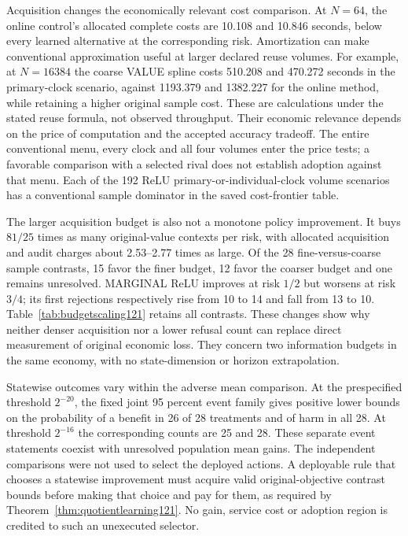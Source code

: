Acquisition changes the economically relevant cost comparison. At $N=64$,
the online control's allocated complete costs are 10.108 and 10.846 seconds,
below every learned alternative at the corresponding risk. Amortization can
make conventional approximation useful at larger declared reuse volumes.
For example, at $N=16384$ the coarse VALUE spline costs 510.208 and 470.272
seconds in the primary-clock scenario, against 1193.379 and 1382.227 for the
online method, while retaining a higher original sample cost. These are
calculations under the stated reuse formula, not observed throughput. Their
economic relevance depends on the price of computation and the accepted
accuracy tradeoff. The entire conventional menu, every clock and all four
volumes enter the price tests; a favorable comparison with a selected rival
does not establish adoption against that menu. Each of the 192 ReLU
primary-or-individual-clock volume scenarios has a conventional sample
dominator in the saved cost-frontier table.

The larger acquisition budget is also not a monotone policy improvement.
It buys $81/25$ times as many original-value contexts per risk, with allocated
acquisition and audit charges about 2.53--2.77 times as large. Of the 28
fine-versus-coarse sample contrasts, 15 favor the finer budget, 12 favor the
coarser budget and one remains unresolved. MARGINAL ReLU improves at risk
$1/2$ but worsens at risk $3/4$; its first rejections respectively rise from
10 to 14 and fall from 13 to 10. Table~\ref{tab:budgetscaling121} retains
all contrasts. These changes show why neither denser acquisition nor a
lower refusal count can replace direct measurement of original economic
loss. They concern two information budgets in the same economy, with no
state-dimension or horizon extrapolation.

Statewise outcomes vary within the adverse mean comparison.
At the prespecified threshold $2^{-20}$, the fixed joint 95 percent event
family gives positive lower bounds on the probability of a benefit in
26 of 28 treatments and of harm in all 28. At threshold $2^{-16}$ the
corresponding counts are 25 and 28. These separate event statements coexist
with unresolved population mean gains. The independent comparisons were
not used to select the deployed actions. A deployable rule that chooses a
statewise improvement must acquire valid original-objective contrast bounds
before making that choice and pay for them, as required by
Theorem~\ref{thm:quotientlearning121}. No gain, service cost or adoption
region is credited to such an unexecuted selector.
